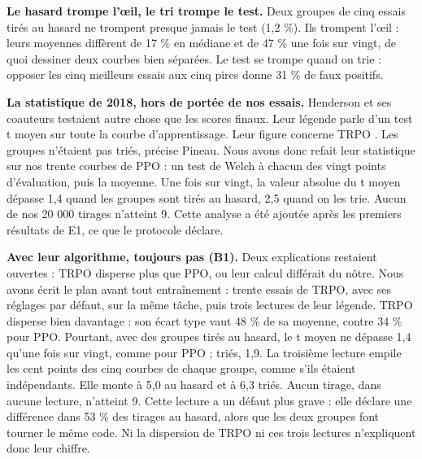 \documentclass[11pt,a4paper]{article}
\begin{document}
\textbf{Le hasard trompe l'œil, le tri trompe le test.} Deux groupes de
cinq essais tirés au hasard ne trompent presque jamais le test (1,2 \%).
Ils trompent l'œil : leurs moyennes diffèrent de 17 \% en médiane et de
47 \% une fois sur vingt, de quoi dessiner deux courbes bien séparées.
Le test se trompe quand on trie : opposer les cinq meilleurs essais aux
cinq pires donne 31 \% de faux positifs.

\textbf{La statistique de 2018, hors de portée de nos essais.} Henderson
et ses coauteurs testaient autre chose que les scores finaux. Leur
légende parle d'un test t moyen sur toute la courbe d'apprentissage.
Leur figure concerne TRPO \autocite{henderson2018matters}. Les groupes
n'étaient pas triés, précise Pineau. Nous avons donc refait leur
statistique sur nos trente courbes de PPO : un test de Welch à chacun
des vingt points d'évaluation, puis la moyenne. Une fois sur vingt, la
valeur absolue du t moyen dépasse 1,4 quand les groupes sont tirés au
hasard, 2,5 quand on les trie. Aucun de nos 20 000 tirages n'atteint 9.
Cette analyse a été ajoutée après les premiers résultats de E1, ce que
le protocole déclare.

\textbf{Avec leur algorithme, toujours pas (B1).} Deux explications
restaient ouvertes : TRPO disperse plus que PPO, ou leur calcul
différait du nôtre. Nous avons écrit le plan avant tout entraînement :
trente essais de TRPO, avec ses réglages par défaut, sur la même tâche,
puis trois lectures de leur légende. TRPO disperse bien davantage : son
écart type vaut 48 \% de sa moyenne, contre 34 \% pour PPO. Pourtant,
avec des groupes tirés au hasard, le t moyen ne dépasse 1,4 qu'une fois
sur vingt, comme pour PPO ; triés, 1,9. La troisième lecture empile les
cent points des cinq courbes de chaque groupe, comme s'ils étaient
indépendants. Elle monte à 5,0 au hasard et à 6,3 triés. Aucun tirage,
dans aucune lecture, n'atteint 9. Cette lecture a un défaut plus grave :
elle déclare une différence dans 53 \% des tirages au hasard, alors que
les deux groupes font tourner le même code. Ni la dispersion de TRPO ni
ces trois lectures n'expliquent donc leur chiffre.
\end{document}
